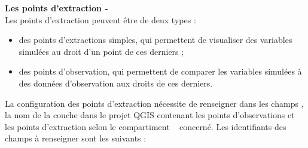 \vspace{8pt}

\textbf{Les points d'extraction - } \\
Les points d'extraction peuvent être de deux types :
\begin{itemize}
    \item[$\bullet$] des points d'extractions simples, qui permettent de
    visualiser des variables simulées au droit d'un point de ces derniers ;
    \item[$\bullet$] des points d'observation, qui permettent de comparer les variables simulées à des données d'observation aux droits de ces derniers.
\end{itemize}



La configuration des points d'extraction nécessite de renseigner dans les champs , la nom de la couche dans le projet QGIS contenant les points d'observations et les points d'extraction selon le compartiment \cws~ concerné. Les identifiants des champs à renseigner sont les suivants : 
\vspace{8pt}

